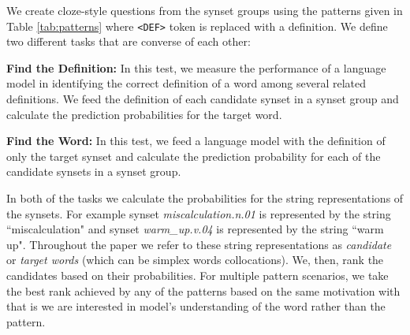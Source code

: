 \documentclass[11pt,a4paper]{article}
\begin{document}
We create cloze-style questions from the synset groups using the patterns given in Table \ref{tab:patterns} where \texttt{<DEF>} token is replaced with a definition. We define two different tasks that are converse of each other:

\vspace{0.3cm}

\noindent\textbf{Find the Definition:} In this test, we measure the performance of a language model in identifying the correct definition of a word among several related definitions. We feed the definition of each candidate synset in a synset group and calculate the prediction probabilities for the target word.

\vspace{0.3cm}

\noindent\textbf{Find the Word:} In this test, we feed a language model with the definition of only the target synset and calculate the prediction probability for each of the candidate synsets in a synset group.  

\vspace{0.3cm}

In both of the tasks we calculate the probabilities for the string representations of the synsets. For example synset \emph{miscalculation.n.01} is represented by the string ``miscalculation" and synset \emph{warm\_up.v.04} is represented by the string ``warm up". Throughout the paper we refer to these string representations as \textit{candidate} or \textit{target words} (which can be simplex words collocations). We, then, rank the candidates based on their probabilities. For multiple pattern scenarios, we take the best rank achieved by any of the patterns based on the same motivation with \cite{Schick20rareWords} that is we are interested in model's understanding of the word rather than the pattern. 

\end{document}
